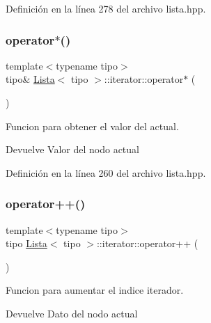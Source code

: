 Definición en la línea 278 del archivo lista.\+hpp.

\mbox{\label{classLista_1_1iterator_a2a48c3991820aef39d777df2c8e19664}} 
\subsubsection{\texorpdfstring{operator$\ast$()}{operator*()}}
{\footnotesize\ttfamily template$<$typename tipo$>$ \\
tipo\& \hyperlink{classLista}{Lista}$<$ tipo $>$\+::iterator\+::operator$\ast$ (\begin{DoxyParamCaption}{ }\end{DoxyParamCaption})\hspace{0.3cm}{\ttfamily [inline]}}



Funcion para obtener el valor del actual. 

\begin{DoxyReturn}{Devuelve}
Valor del nodo actual 
\end{DoxyReturn}


Definición en la línea 260 del archivo lista.\+hpp.

\mbox{\label{classLista_1_1iterator_af8c7d385ce8bc7c62b8bc806db714ae9}} 
\subsubsection{\texorpdfstring{operator++()}{operator++()}\hspace{0.1cm}{\footnotesize\ttfamily [1/2]}}
{\footnotesize\ttfamily template$<$typename tipo$>$ \\
tipo \hyperlink{classLista}{Lista}$<$ tipo $>$\+::iterator\+::operator++ (\begin{DoxyParamCaption}{ }\end{DoxyParamCaption})\hspace{0.3cm}{\ttfamily [inline]}}



Funcion para aumentar el indice iterador. 

\begin{DoxyReturn}{Devuelve}
Dato del nodo actual 
\end{DoxyReturn}


